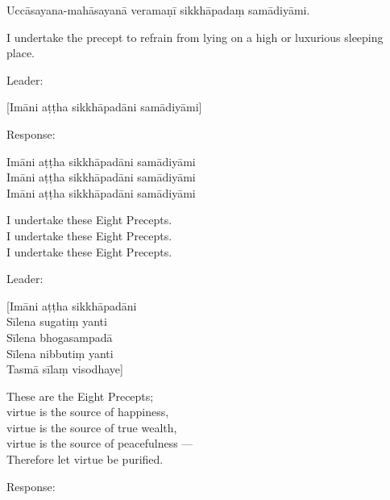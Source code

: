 \begin{precept}
  \setcounter{enumi}{7}
  \item Uccāsayana-mahāsayanā veramaṇī sikkhāpadaṃ samādiyāmi.
\end{precept}

\begin{english}
  I undertake the precept to refrain from lying on a high or luxurious sleeping place.
\end{english}

\begin{instruction}
  Leader:
\end{instruction}

[Imāni aṭṭha sikkhāpadāni samādiyāmi]

\begin{instruction}
  Response:
\end{instruction}

Imāni aṭṭha sikkhāpadāni samādiyāmi\\
Imāni aṭṭha sikkhāpadāni samādiyāmi\\
Imāni aṭṭha sikkhāpadāni samādiyāmi

\begin{english}
  I undertake these Eight Precepts.\\
  I undertake these Eight Precepts.\\
  I undertake these Eight Precepts.
\end{english}

\begin{instruction}
  Leader:
\end{instruction}

[Imāni aṭṭha sikkhāpadāni\\
Sīlena sugatiṃ yanti\\
Sīlena bhogasampadā\\
Sīlena nibbutiṃ yanti\\
Tasmā sīlaṃ visodhaye]

\begin{english}
  These are the Eight Precepts;\\
  virtue is the source of happiness,\\
  virtue is the source of true wealth,\\
  virtue is the source of peacefulness ---\\
  Therefore let virtue be purified.
\end{english}

\begin{instruction}
  Response:
\end{instruction}

